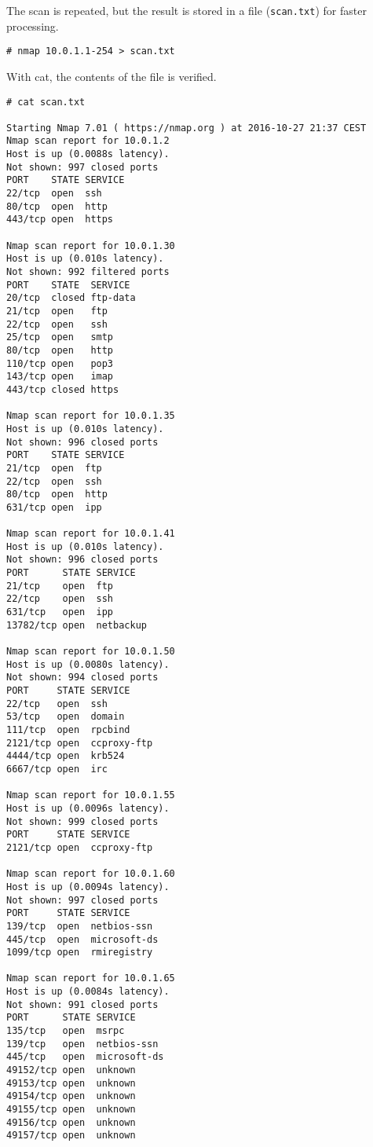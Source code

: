 The scan is repeated, but the result is stored in a file
(\texttt{scan.txt}) for faster processing.

\begin{lstlisting}[numbers=none, language={}, frame=single, framexleftmargin={0.2em}]
# nmap 10.0.1.1-254 > scan.txt
\end{lstlisting}

With cat, the contents of the file is verified.

\begin{lstlisting}[numbers=none, language={}, frame=single, framexleftmargin={0.2em}]
# cat scan.txt

Starting Nmap 7.01 ( https://nmap.org ) at 2016-10-27 21:37 CEST
Nmap scan report for 10.0.1.2
Host is up (0.0088s latency).
Not shown: 997 closed ports
PORT    STATE SERVICE
22/tcp  open  ssh
80/tcp  open  http
443/tcp open  https

Nmap scan report for 10.0.1.30
Host is up (0.010s latency).
Not shown: 992 filtered ports
PORT    STATE  SERVICE
20/tcp  closed ftp-data
21/tcp  open   ftp
22/tcp  open   ssh
25/tcp  open   smtp
80/tcp  open   http
110/tcp open   pop3
143/tcp open   imap
443/tcp closed https

Nmap scan report for 10.0.1.35
Host is up (0.010s latency).
Not shown: 996 closed ports
PORT    STATE SERVICE
21/tcp  open  ftp
22/tcp  open  ssh
80/tcp  open  http
631/tcp open  ipp

Nmap scan report for 10.0.1.41
Host is up (0.010s latency).
Not shown: 996 closed ports
PORT      STATE SERVICE
21/tcp    open  ftp
22/tcp    open  ssh
631/tcp   open  ipp
13782/tcp open  netbackup

Nmap scan report for 10.0.1.50
Host is up (0.0080s latency).
Not shown: 994 closed ports
PORT     STATE SERVICE
22/tcp   open  ssh
53/tcp   open  domain
111/tcp  open  rpcbind
2121/tcp open  ccproxy-ftp
4444/tcp open  krb524
6667/tcp open  irc

Nmap scan report for 10.0.1.55
Host is up (0.0096s latency).
Not shown: 999 closed ports
PORT     STATE SERVICE
2121/tcp open  ccproxy-ftp

Nmap scan report for 10.0.1.60
Host is up (0.0094s latency).
Not shown: 997 closed ports
PORT     STATE SERVICE
139/tcp  open  netbios-ssn
445/tcp  open  microsoft-ds
1099/tcp open  rmiregistry

Nmap scan report for 10.0.1.65
Host is up (0.0084s latency).
Not shown: 991 closed ports
PORT      STATE SERVICE
135/tcp   open  msrpc
139/tcp   open  netbios-ssn
445/tcp   open  microsoft-ds
49152/tcp open  unknown
49153/tcp open  unknown
49154/tcp open  unknown
49155/tcp open  unknown
49156/tcp open  unknown
49157/tcp open  unknown


\end{lstlisting}
